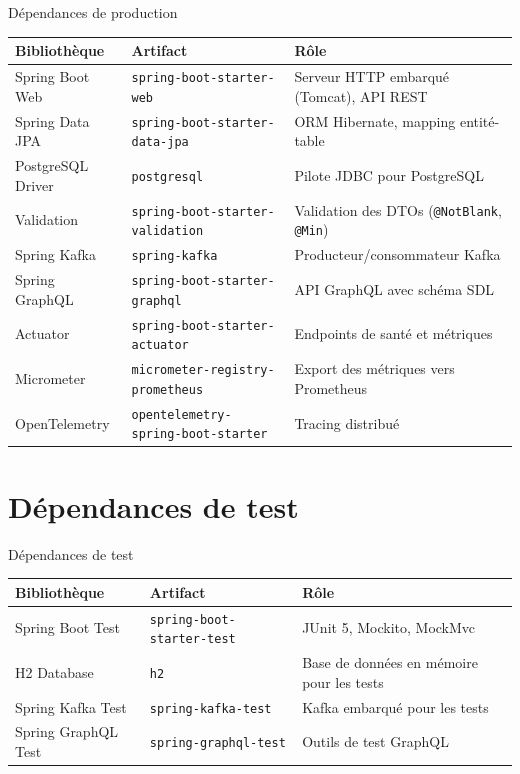 \documentclass[12pt,a4paper]{report}
\begin{document}
\begin{adrbox}{D\'ependances de production}
\begin{tabularx}{\textwidth}{l l X}
\toprule
\textbf{Biblioth\`eque} & \textbf{Artifact} & \textbf{R\^ole} \\
\midrule
Spring Boot Web & \texttt{spring-boot-starter-web} & Serveur HTTP embarqu\'e (Tomcat), API REST \\
Spring Data JPA & \texttt{spring-boot-starter-data-jpa} & ORM Hibernate, mapping entit\'e-table \\
PostgreSQL Driver & \texttt{postgresql} & Pilote JDBC pour PostgreSQL \\
Validation & \texttt{spring-boot-starter-validation} & Validation des DTOs (\texttt{@NotBlank}, \texttt{@Min}) \\
Spring Kafka & \texttt{spring-kafka} & Producteur/consommateur Kafka \\
Spring GraphQL & \texttt{spring-boot-starter-graphql} & API GraphQL avec sch\'ema SDL \\
Actuator & \texttt{spring-boot-starter-actuator} & Endpoints de sant\'e et m\'etriques \\
Micrometer & \texttt{micrometer-registry-prometheus} & Export des m\'etriques vers Prometheus \\
OpenTelemetry & \texttt{opentelemetry-spring-boot-starter} & Tracing distribu\'e \\
\bottomrule
\end{tabularx}
\end{adrbox}

\section{D\'ependances de test}

\begin{adrbox}{D\'ependances de test}
\begin{tabularx}{\textwidth}{l l X}
\toprule
\textbf{Biblioth\`eque} & \textbf{Artifact} & \textbf{R\^ole} \\
\midrule
Spring Boot Test & \texttt{spring-boot-starter-test} & JUnit 5, Mockito, MockMvc \\
H2 Database & \texttt{h2} & Base de donn\'ees en m\'emoire pour les tests \\
Spring Kafka Test & \texttt{spring-kafka-test} & Kafka embarqu\'e pour les tests \\
Spring GraphQL Test & \texttt{spring-graphql-test} & Outils de test GraphQL \\
\bottomrule
\end{tabularx}
\end{adrbox}
\end{document}
